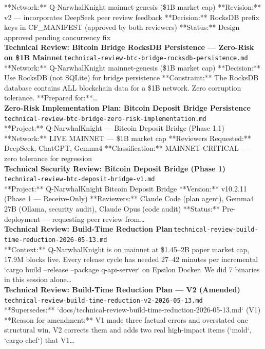 \documentclass[11pt,a4paper]{article}
\begin{document}
**Network:** Q-NarwhalKnight mainnet-genesis (\$1B market cap) **Revision:** v2 --- incorporates DeepSeek peer review feedback **Decision:** RocksDB prefix keys in CF\_MANIFEST (approved by both reviewers) **Status:** Design approved pending concurrency fix\\[6pt]
\noindent\textbf{Technical Review: Bitcoin Bridge RocksDB Persistence --- Zero-Risk on \$1B Mainnet}\,\textcolor{qgray}{\small \texttt{technical-review-btc-bridge-rocksdb-persistence.md}}\\
**Network:** Q-NarwhalKnight mainnet-genesis (\$1B market cap) **Decision:** Use RocksDB (not SQLite) for bridge persistence **Constraint:** The RocksDB database contains ALL blockchain data for a \$1B network. Zero corruption tolerance. **Prepared for:**\ldots{}\\[6pt]
\noindent\textbf{Zero-Risk Implementation Plan: Bitcoin Deposit Bridge Persistence}\,\textcolor{qgray}{\small \texttt{technical-review-btc-bridge-zero-risk-implementation.md}}\\
**Project:** Q-NarwhalKnight --- Bitcoin Deposit Bridge (Phase 1.1) **Network:** LIVE MAINNET --- \$1B market cap **Reviewers Requested:** DeepSeek, ChatGPT, Gemma4 **Classification:** MAINNET-CRITICAL --- zero tolerance for regression\\[6pt]
\noindent\textbf{Technical Security Review: Bitcoin Deposit Bridge (Phase 1)}\,\textcolor{qgray}{\small \texttt{technical-review-btc-deposit-bridge-v1.md}}\\
**Project:** Q-NarwhalKnight Bitcoin Deposit Bridge **Version:** v10.2.11 (Phase 1 --- Receive-Only) **Reviewers:** Claude Code (plan agent), Gemma4 27B (Ollama, security audit), Claude Opus (code audit) **Status:** Pre-deployment --- requesting peer review from\ldots{}\\[6pt]
\noindent\textbf{Technical Review: Build-Time Reduction Plan}\,\textcolor{qgray}{\small \texttt{technical-review-build-time-reduction-2026-05-13.md}}\\
**Context:** Q-NarwhalKnight is on mainnet at \$1.45--2B paper market cap, 17.9M blocks live. Every release cycle has needed 27--42 minutes per incremental `cargo build --release --package q-api-server` on Epsilon Docker. We did 7 binaries in this session alone\ldots{}\\[6pt]
\noindent\textbf{Technical Review: Build-Time Reduction Plan --- V2 (Amended)}\,\textcolor{qgray}{\small \texttt{technical-review-build-time-reduction-v2-2026-05-13.md}}\\
**Supersedes:** `docs/technical-review-build-time-reduction-2026-05-13.md` (V1) **Reason for amendment:** V1 made three factual errors and overstated one structural win. V2 corrects them and adds two real high-impact items (`mold`, `cargo-chef`) that V1\ldots{}\\[6pt]
\end{document}
